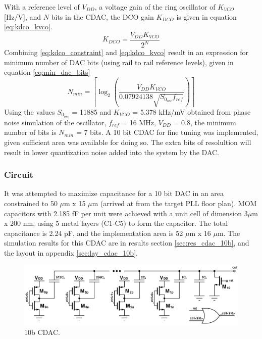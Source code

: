 	With a reference level of $V_{DD}$, a voltage gain of the ring oscillator of $K_{VCO}$ [Hz/V], and $N$ bits in the CDAC, the DCO gain $K_{DCO}$ is given in equation \ref{eq:kdco_kvco}.
	\begin{equation}\label{eq:kdco_kvco}
		K_{DCO} = \frac{V_{DD}K_{VCO}}{2^N}
	\end{equation}
	Combining \ref{eq:kdco_constraint} and \ref{eq:kdco_kvco} result in an expression for minimum number of DAC bits (using rail to rail reference levels), given in equation \ref{eq:min_dac_bits}
	\begin{equation}\label{eq:min_dac_bits}
		N_{min} = \left\lceil \log_2\left( \frac{V_{DD}K_{VCO}}{0.07924138\sqrt{S_{0_{osc}} f_{ref}}} \right)\right\rceil
	\end{equation}
	Using the values $S_{0_{osc}}$ = 11885 and $K_{VCO}$ = 5.378 kHz/mV obtained from phase noise simulation of the oscillator, $f_{ref}$ = 16 MHz, $V_{DD}$ = 0.8, the minimum number of bits is $N_{min}$ = 7 bits.  A 10 bit CDAC for fine tuning was implemented, given sufficient area was available for doing so. The extra bits of resolultion will result in lower quantization noise added into the system by the DAC.

		\subsubsection{Circuit}
		It was attempted to maximize capacitance for a 10 bit DAC in an area constrained to 50 $\mu$m x 15 $\mu$m (arrived at from the target PLL floor plan). MOM capacitors with 2.185 fF per unit were achieved with a unit cell of dimension 3$\mu$m x 200 nm, using 5 metal layers (C1-C5) to form the capacitor. The total capacitance is 2.24 pF, and the implementation area is 52 $\mu$m x 16 $\mu$m. The simulation results for this CDAC are in results section \ref{sec:res_cdac_10b}, and the layout in appendix \ref{sec:lay_cdac_10b}.
	
			\begin{figure}[htb!]
			        \centering
			        \includegraphics[width=\textwidth, angle=0]{./figs/design/cdac_10b}
			    \caption{10b CDAC.}
			    \label{fig:10b_cdac_cir}
			\end{figure}

